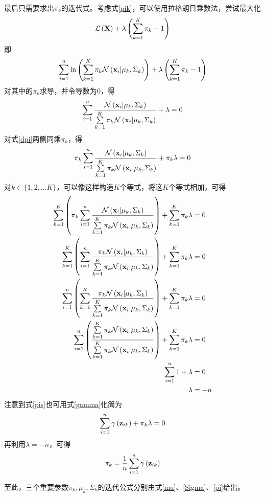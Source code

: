 最后只需要求出$\pi_k$的迭代式。考虑式\ref{pik}，可以使用拉格朗日乘数法，尝试最大化
\begin{equation}
    \mathcal{L}\left(\mathbf{X}\right)+\lambda\left(\sum\limits^K_{k=1}\pi_k-1\right)
\end{equation}
即
\begin{equation}
    \sum\limits^n_{i=1}\ln\left(\sum\limits^K_{k=1}\pi_k\mathcal{N}\left(\mathbf{x}_i|\mu_k,\Sigma_k\right)\right)+\lambda\left(\sum\limits^K_{k=1}\pi_k-1\right)
\end{equation}
对其中的$\pi_k$求导，并令导数为$0$，得
\begin{equation}
    \label{dpi}
    \sumn\dfrac{\gauss}{\sumk\pi_k\gauss}+\lambda=0
\end{equation}
对式\ref{dpi}两侧同乘$\pi_k$，得
\begin{equation}
    \label{pis}
    \pi_k\sumn\dfrac{\gauss}{\sumk\pi_k\gauss}+\pi_k\lambda=0
\end{equation}
对$k\in\{1,2,\ldots K\}$，可以像这样构造$K$个等式，将这$K$个等式相加，可得
\begin{align}
    \sum^K_{k=1}\left(\pi_k\sum\limits^n_{i=1}\dfrac{\mathcal{N}\left(\mathbf{x}_i|\mu_k,\Sigma_k\right)}{\sum\limits^K_{k=1}\pi_k\mathcal{N}\left(\mathbf{x}_i|\mu_k,\Sigma_k\right)}\right)+\sum^K_{k=1}\pi_k\lambda &= 0 \\
    \sum^K_{k=1}\left(\sum\limits^n_{i=1}\dfrac{\pi_k\mathcal{N}\left(\mathbf{x}_i|\mu_k,\Sigma_k\right)}{\sum\limits^K_{k=1}\pi_k\mathcal{N}\left(\mathbf{x}_i|\mu_k,\Sigma_k\right)}\right)+\sum^K_{k=1}\pi_k\lambda &= 0 \\
    \sum\limits^n_{i=1}\left(\sum^K_{k=1}\dfrac{\pi_k\mathcal{N}\left(\mathbf{x}_i|\mu_k,\Sigma_k\right)}{\sum\limits^K_{k=1}\pi_k\mathcal{N}\left(\mathbf{x}_i|\mu_k,\Sigma_k\right)}\right)+\sum^K_{k=1}\pi_k\lambda &= 0 \\
    \sum\limits^n_{i=1}\left(\dfrac{\sum\limits^K_{k=1}\pi_k\mathcal{N}\left(\mathbf{x}_i|\mu_k,\Sigma_k\right)}{\sum\limits^K_{k=1}\pi_k\mathcal{N}\left(\mathbf{x}_i|\mu_k,\Sigma_k\right)}\right)+\sum^K_{k=1}\pi_k\lambda &= 0 \\
    \sum\limits^n_{i=1}1+\lambda &= 0 \\
    \lambda &= -n
\end{align}
注意到式\ref{pis}也可用式\ref{gamma}化简为
\begin{equation}
    \sum\limits^n_{i=1}\gamma\left(\mathbf{z}_{i {k}}\right)+\pi_k\lambda=0
\end{equation}
再利用$\lambda=-n$，可得
\begin{equation}
    \label{pi}
    \pi_k=\dfrac{1}{n}\sumn\gammaz{k}
\end{equation}

至此，三个重要参数$\pi_k, \mu_k, \Sigma_k$的迭代公式分别由式\ref{mu}、\ref{Sigma}、\ref{pi}给出。

